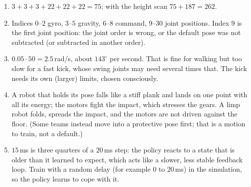 \begin{enumerate}[label=\textbf{\ansnum.\arabic*}]
  \item $3+3+3+22+22+22=75$; with the height scan $75+187=262$.
  \item Indices $0$--$2$ gyro, $3$--$5$ gravity, $6$--$8$ command, $9$--$30$ joint positions. Index $9$ is the first joint position: the joint order is wrong, or the default pose was not subtracted (or subtracted in another order).
  \item $0.05\cdot50=2.5$\,rad/s, about $143^\circ$ per second. That is fine for walking but too slow for a fast kick, whose swing joints may need several times that. The kick needs its own (larger) limits, chosen consciously.
  \item A robot that holds its pose falls like a stiff plank and lands on one point with all its energy; the motors fight the impact, which stresses the gears. A limp robot folds, spreads the impact, and the motors are not driven against the floor. (Some teams instead move into a protective pose first; that is a motion to train, not a default.)
  \item $15$\,ms is three quarters of a $20$\,ms step: the policy reacts to a state that is older than it learned to expect, which acts like a slower, less stable feedback loop. Train with a random delay (for example $0$ to $20$\,ms) in the simulation, so the policy learns to cope with it.
\end{enumerate}
